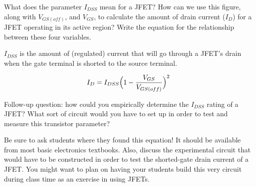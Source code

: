 

What does the parameter $I_{DSS}$ mean for a JFET?  How can we use this figure, along with $V_{GS(off)}$, and $V_{GS}$, to calculate the amount of drain current ($I_D$) for a JFET operating in its active region?  Write the equation for the relationship between these four variables.







$I_{DSS}$ is the amount of (regulated) current that will go through a JFET's drain when the gate terminal is shorted to the source terminal.

$$I_D = I_{DSS}\Bigl(1 - {V_{GS} \over V_{GS(off)}}\Bigr)^2$$

Follow-up question: how could you empirically determine the $I_{DSS}$ rating of a JFET?  What sort of circuit would you have to set up in order to test and measure this transistor parameter?







Be sure to ask students where they found this equation!  It should be available from most basic electronics textbooks.  Also, discuss the experimental circuit that would have to be constructed in order to test the shorted-gate drain current of a JFET.  You might want to plan on having your students build this very circuit during class time as an exercise in using JFETs.




